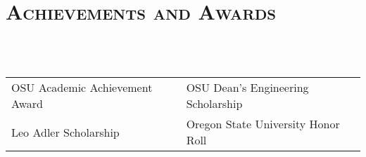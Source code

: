 \documentclass[letterpaper,10pt,titlepage]{article}
\begin{document}
\begin{comment} %
\begin{tabularx}{\linewidth}{Xr}
\textbf{\textit{Crossroads Carnegie Art Center}} & \textbf{Volunteer}\\
\textbf{Technical Support, Web Master}           & June 2013 -- August 2013\\
Baker City, Oregon & \\
\end{tabularx}

\begin{itemize} \itemsep1pt \parskip0pt \parsep0pt
\item Created digital backups of previous years tax information
\item Transferred customer data to a new cloud database for the Center
\item Maintained custom PHP/XHTML website to specifications
\item Provided consultation on creation of requirements for a new website
\end{itemize}
\end{comment}


\section*{\textsc{Achievements and Awards}}
~\\
~\\
\begin{tabularx}{\linewidth}{>{\centering\arraybackslash}X|>{\centering\arraybackslash}X}
OSU Academic Achievement Award & OSU Dean's Engineering Scholarship \\
Leo Adler Scholarship & Oregon State University Honor Roll\\
\end{tabularx}
\end{document}
